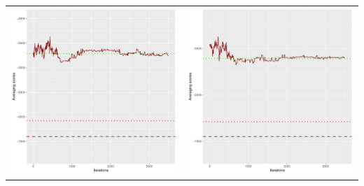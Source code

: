 \documentclass[]{scrartcl}
\begin{document}
\begin{table}[h!]
\begin{tabular}{cc}
\includegraphics[scale = 0.4]{./figs/alarm/v1/30/avgBoundsEvolution-3502.pdf} & 
\includegraphics[scale = 0.4]{./figs/alarm/v1/50/avgBoundsEvolution-3502.pdf} \\

\end{tabular}
\end{table}
\end{document}
